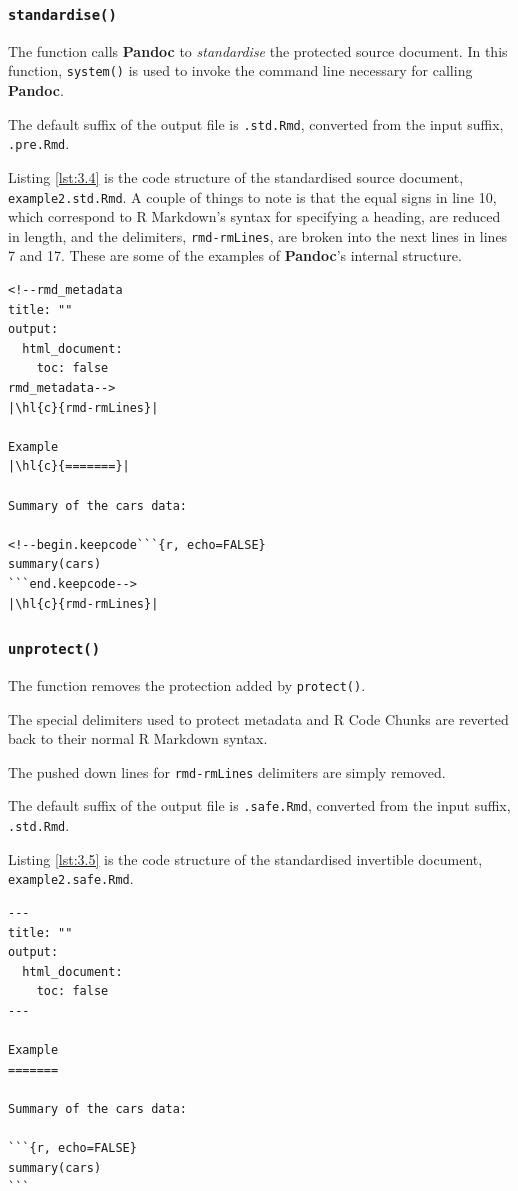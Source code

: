 \documentclass[a4paper, 12pt]{report}
\begin{document}
\subsubsection*{\texttt{standardise()}}
The function calls \textbf{Pandoc} to \emph{standardise} the protected source document. In this function, \texttt{system()} is used to invoke the command line necessary for calling \textbf{Pandoc}.

The default suffix of the output file is \texttt{.std.Rmd}, converted from the input suffix, \texttt{.pre.Rmd}.

Listing \ref{lst:3.4} is the code structure of the standardised source document, \texttt{example2.std.Rmd}. A couple of things to note is that the equal signs in line 10, which correspond to R Markdown's syntax for specifying a heading, are reduced in length, and the delimiters, \texttt{rmd-rmLines}, are broken into the next lines in lines 7 and 17. These are some of the examples of \textbf{Pandoc}'s internal structure.
\begin{lstlisting}[caption={\texttt{example2.std.Rmd}}, escapechar=\|, label={lst:3.4}]
<!--rmd_metadata
title: ""
output:
  html_document:
    toc: false
rmd_metadata-->
|\hl{c}{rmd-rmLines}|

Example
|\hl{c}{=======}|

Summary of the cars data:

<!--begin.keepcode```{r, echo=FALSE}
summary(cars)
```end.keepcode-->
|\hl{c}{rmd-rmLines}|
\end{lstlisting}


\subsubsection*{\texttt{unprotect()}}
The function removes the protection added by \texttt{protect()}.

The special delimiters used to protect metadata and R Code Chunks are reverted back to their normal R Markdown syntax.

The pushed down lines for \texttt{rmd-rmLines} delimiters are simply removed.

The default suffix of the output file is \texttt{.safe.Rmd}, converted from the input suffix, \texttt{.std.Rmd}.

Listing \ref{lst:3.5} is the code structure of the standardised invertible document, \texttt{example2.safe.Rmd}.
\begin{lstlisting}[caption={\texttt{example2.safe.Rmd}}, escapechar=\|, label={lst:3.5}]
---
title: ""
output:
  html_document:
    toc: false
---

Example
=======

Summary of the cars data:

```{r, echo=FALSE}
summary(cars)
```
\end{lstlisting}
\end{document}
